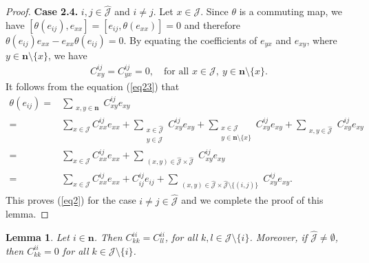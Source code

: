 \documentclass[reqno]{amsart}
\theoremstyle{plain}
\newtheorem{lemma}[theorem]{Lemma}
\theoremstyle{definition}
\begin{document}
\begin{proof}
\textbf{Case 2.4.} $i, j \in \hat{\mathcal{J}}$ and $i \neq j$. Let $x \in \mathcal{J}$. Since $\theta$ is a commuting map, we have $[\theta(e_{ij}), e_{xx}] = [e_{ij}, \theta(e_{xx})] = 0$ and therefore $\theta(e_{ij}) e_{xx} - e_{xx} \theta(e_{ij}) = 0$.
By equating the coefficients of $e_{yx}$ and $e_{xy}$, where $y \in \mathbf{n} \setminus \{x\}$, we have
 \begin{align}\label{eq23}
C_{xy}^{ij} = C_{yx}^{ij} = 0, \quad \text{for all } x \in \mathcal{J},~y \in \mathbf{n} \setminus \{x\}.
\end{align}
It follows from the equation (\ref{eq23}) that
\[
\begin{aligned}
\theta(e_{ij}) =& \sum_{\substack{x,y \in \mathbf{n}}} C_{xy}^{ij} e_{xy} \\
=& \sum_{x \in \mathcal{J}} C_{xx}^{ij} e_{xx} + \sum_{\substack{x \in \hat{\mathcal{J}} \\ y \in \mathcal{J}}} C_{xy}^{ij} e_{xy} + \sum_{\substack{x \in \mathcal{J} \\ y \in \mathbf{n} \setminus \{x\}}} C_{xy}^{ij} e_{xy} + \sum_{\substack{x,y \in \hat{\mathcal{J}}}} C_{xy}^{ij} e_{xy} \\
=& \sum_{x \in \mathcal{J}} C_{xx}^{ij} e_{xx}  + \sum_{\substack{(x,y) \in \hat{\mathcal{J}}\times \hat{\mathcal{J}}}} C_{xy}^{ij} e_{xy}\\
=& \sum_{x \in \mathcal{J}} C_{xx}^{ij} e_{xx} + C_{ij}^{ij} e_{ij} + \sum_{\substack{(x,y) \in \hat{\mathcal{J}}\times \hat{\mathcal{J}}\setminus \{(i,j)\}}} C_{xy}^{ij} e_{xy}.
\end{aligned}
\]
This proves (\ref{eq2}) for the case $i\neq j \in \hat{\mathcal{J}}$ and we complete the proof of this lemma.
\end{proof}


\begin{lemma}\label{l23}
Let $i \in \mathbf{n}$. Then $C_{kk}^{ii} = C_{ll}^{ii}$, for all $k, l \in \mathcal{J} \setminus \{i\}$. Moreover, if $\hat{\mathcal{J}} \neq \emptyset$, then $C_ {kk}^{ii} = 0$ for all $k \in \mathcal{J} \setminus \{i\}$.
\end{lemma}
\end{document}
